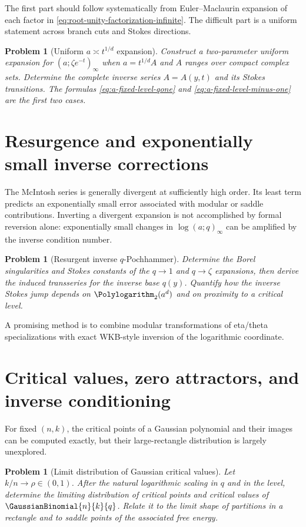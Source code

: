 \documentclass[11pt,oneside]{book}
\newtheorem{problem}[theorem]{Problem}
\theoremstyle{definition}
\theoremstyle{remark}
\begin{document}
The first part should follow systematically from Euler--Maclaurin expansion of
each factor in \eqref{eq:root-unity-factorization-infinite}.  The difficult
part is a uniform statement across branch cuts and Stokes directions.

\begin{problem}[Uniform $a\asymp t^{1/d}$ expansion]
Construct a two-parameter uniform expansion for
$(a;\zeta e^{-t})_\infty$ when $a=t^{1/d}A$ and $A$ ranges over compact
complex sets.  Determine the complete inverse series $A=A(y,t)$ and its
Stokes transitions.  The formulas \eqref{eq:a-fixed-level-qone} and
\eqref{eq:a-fixed-level-minus-one} are the first two cases.
\end{problem}

\section{Resurgence and exponentially small inverse corrections}
The McIntosh series is generally divergent at sufficiently high order.  Its
least term predicts an exponentially small error associated with modular or
saddle contributions.  Inverting a divergent expansion is not accomplished
by formal reversion alone: exponentially small changes in $\log(a;q)_\infty$
can be amplified by the inverse condition number.

\begin{problem}[Resurgent inverse $q$-Pochhammer]
Determine the Borel singularities and Stokes constants of the $q\to1$ and
$q\to\zeta$ expansions, then derive the induced transseries for the inverse
base $q(y)$.  Quantify how the inverse Stokes jump depends on
$\Polylogarithm_2(a^d)$ and on proximity to a critical level.
\end{problem}

A promising method is to combine modular transformations of eta/theta
specializations with exact WKB-style inversion of the logarithmic coordinate.

\section{Critical values, zero attractors, and inverse conditioning}
For fixed $(n,k)$, the critical points of a Gaussian polynomial and their
images can be computed exactly, but their large-rectangle distribution is
largely unexplored.

\begin{problem}[Limit distribution of Gaussian critical values]
Let $k/n\to\rho\in(0,1)$.  After the natural logarithmic scaling in $q$ and
in the level, determine the limiting distribution of critical points and
critical values of $\GaussianBinomial{n}{k}{q}$.  Relate it to the limit shape of
partitions in a rectangle and to saddle points of the associated free energy.
\end{problem}
\end{document}
